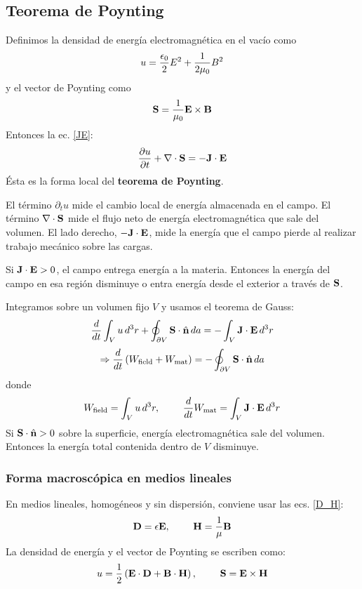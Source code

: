 \documentclass[]{article}
\numberwithin{equation}{section}
\begin{document}
\subsection{Teorema de Poynting}
Definimos la densidad de energía electromagnética en el vacío como
\begin{equation}
	u = \frac{\epsilon_{0}}{2} E^2 + \frac{1}{2\mu_{0}}B^2
\end{equation}
y el vector de Poynting como
\begin{equation}
	\mathbf{S} = \frac{1}{\mu_{0}} \mathbf{E}\times\mathbf{B}
\end{equation}
Entonces la ec. \ref{JE}:
\begin{equation}
	\dfrac{\partial u}{\partial t} + \nabla\cdot\mathbf{S} = -\mathbf{J}\cdot\mathbf{E}
\end{equation}
Ésta es la forma local del \textbf{teorema de Poynting}.

El término \(\partial_{t} u\) mide el cambio local de energía almacenada en el campo. El término \(\nabla\cdot\mathbf{S}\) mide el flujo neto de energía electromagnética que sale del volumen. El lado derecho, \(-\mathbf{J}\cdot\mathbf{E}\), mide la energía que el campo pierde al realizar trabajo mecánico sobre las cargas.

Si \(\mathbf{J}\cdot\mathbf{E} > 0\), el campo entrega energía a la materia. Entonces la energía del campo en esa
región disminuye o entra energía desde el exterior a través de \(\mathbf{S}\).

Integramos sobre un volumen fijo \(V\) y usamos el teorema de Gauss:
\begin{equation*}
	\dfrac{d }{d t} \int_{V} u \, d^3r + \oint_{\partial V} \mathbf{S}\cdot\hat{\mathbf{n}} \, da = - \int_{V}\mathbf{J}\cdot\mathbf{E} \, d^3 r
\end{equation*}
\begin{equation}
	\Rightarrow \dfrac{d }{d t} \left(W_{\mathrm{field}} + W_{\mathrm{mat}}\right) = - \oint_{\partial V} \mathbf{S}\cdot\hat{\mathbf{n}} \, da
\end{equation}
donde
\begin{equation}
	W_{\mathrm{field}} = \int_{V} u \, d^3r, ~~~~~~~ \dfrac{d }{d t} W_{\mathrm{mat}} = \int_{V}\mathbf{J}\cdot\mathbf{E} \, d^3 r
\end{equation}
Si \(\mathbf{S}\cdot\hat{\mathbf{n}} > 0\) sobre la superficie, energía electromagnética sale del volumen. Entonces la energía total contenida dentro de \(V\) disminuye.

\subsubsection{Forma macroscópica en medios lineales}
En medios lineales, homogéneos y sin dispersión, conviene usar las ecs. \ref{D_H}:
\begin{equation*}
	\mathbf{D} = \epsilon\mathbf{E}, ~~~~~~~ \mathbf{H} = \frac{1}{\mu}\mathbf{B}
\end{equation*}
La densidad de energía y el vector de Poynting se escriben como:
\begin{equation}
	u = \frac{1}{2}\left(\mathbf{E}\cdot\mathbf{D} + \mathbf{B}\cdot\mathbf{H}\right), ~~~~~~~ \mathbf{S} = \mathbf{E}\times\mathbf{H} \label{u_S}
\end{equation}
\end{document}
